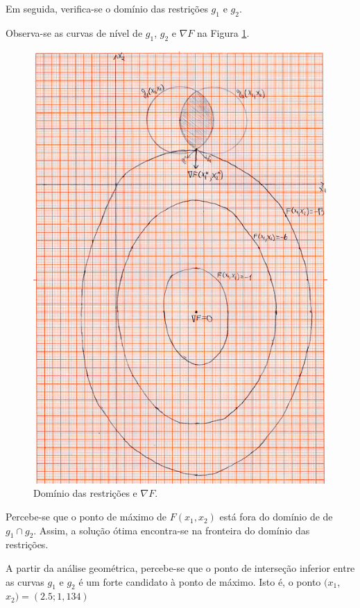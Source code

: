 \documentclass{article}
\begin{document}
    Em seguida, verifica-se o domínio das restrições $g_{1}$ e $g_{2}$. 
    
    Observa-se as curvas de nível de $g_{1}$, $g_{2}$ e $\nabla F$ na Figura \ref{dominio}.
    
        \begin{figure}[H]
            \centering
            \includegraphics[scale=1]{q1.png}
            \caption{Domínio das restrições e $\nabla F$.}
            \label{dominio}
        \end{figure}
    
        
    Percebe-se que o ponto de máximo de $F(x_{1}, x_{2})$ está fora do domínio de de $g_{1} \cap g_{2} $. Assim, a solução ótima encontra-se na fronteira do domínio das restrições.
    
    A partir da análise geométrica, percebe-se que o ponto de interseção inferior entre as curvas $g_{1}$ e $g_{2}$ é um forte candidato à ponto de máximo. Isto é, o ponto $(x_{1}$, $x_{2}) = (2.5; 1,134 )$ 
    
\end{document}
